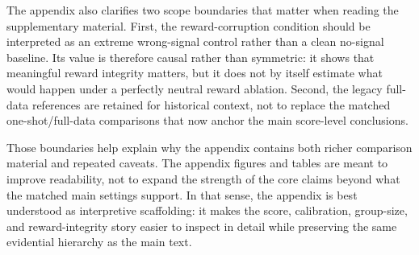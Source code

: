 \documentclass[12pt,a4paper]{ctexart}
\begin{document}
The appendix also clarifies two scope boundaries that matter when reading the supplementary material. First, the reward-corruption condition should be interpreted as an extreme wrong-signal control rather than a clean no-signal baseline. Its value is therefore causal rather than symmetric: it shows that meaningful reward integrity matters, but it does not by itself estimate what would happen under a perfectly neutral reward ablation. Second, the legacy full-data references are retained for historical context, not to replace the matched one-shot/full-data comparisons that now anchor the main score-level conclusions.

Those boundaries help explain why the appendix contains both richer comparison material and repeated caveats. The appendix figures and tables are meant to improve readability, not to expand the strength of the core claims beyond what the matched main settings support. In that sense, the appendix is best understood as interpretive scaffolding: it makes the score, calibration, group-size, and reward-integrity story easier to inspect in detail while preserving the same evidential hierarchy as the main text.
\end{document}
